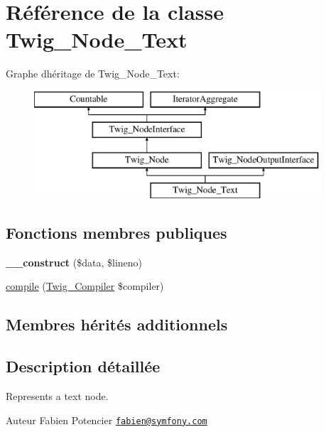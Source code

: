 \hypertarget{class_twig___node___text}{}\section{Référence de la classe Twig\+\_\+\+Node\+\_\+\+Text}
\label{class_twig___node___text}
Graphe d\textquotesingle{}héritage de Twig\+\_\+\+Node\+\_\+\+Text\+:\begin{figure}[H]
\begin{center}
\leavevmode
\includegraphics[height=4.000000cm]{class_twig___node___text}
\end{center}
\end{figure}
\subsection*{Fonctions membres publiques}
\begin{DoxyCompactItemize}
\item 
{\bfseries \+\_\+\+\_\+construct} (\$data, \$lineno)\hypertarget{class_twig___node___text_af456fd2c3110f37c58c62fbd5e5fa4e1}{}\label{class_twig___node___text_af456fd2c3110f37c58c62fbd5e5fa4e1}

\item 
\hyperlink{class_twig___node___text_a4e0faa87c3fae583620b84d3607085da}{compile} (\hyperlink{class_twig___compiler}{Twig\+\_\+\+Compiler} \$compiler)
\end{DoxyCompactItemize}
\subsection*{Membres hérités additionnels}


\subsection{Description détaillée}
Represents a text node.

\begin{DoxyAuthor}{Auteur}
Fabien Potencier \href{mailto:fabien@symfony.com}{\tt fabien@symfony.\+com} 
\end{DoxyAuthor}


